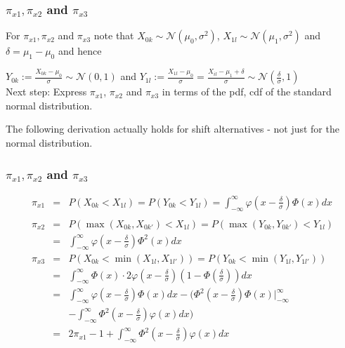 \documentclass[xcolor=pdftex,dvipsnames,table]{beamer}
\begin{document}
\begin{frame} %
\frametitle{$\pi_{x1}, \pi_{x2}$ and $\pi_{x3}$}
For $\pi_{x1}, \pi_{x2}$ and $\pi_{x3}$ note that
$X_{0k} \sim \mathcal{N}(\mu_0, \sigma^2)$, $X_{1l} \sim \mathcal{N}(\mu_1, \sigma^2)$ and $\delta = \mu_1 - \mu_0$ and hence

$Y_{0k}:=\frac{X_{0k} - \mu_0}{\sigma} \sim \mathcal{N}(0, 1)$ and $Y_{1l}:=\frac{X_{1l} - \mu_0}{\sigma} = \frac{X_{il} - \mu_1 + \delta}{\sigma} \sim \mathcal{N}( \frac{\delta}{\sigma}, 1)$
\\
Next step: Express $\pi_{x1}$, $\pi_{x2}$ and $\pi_{x3}$ in terms of the pdf, cdf of the standard normal distribution.

The following derivation actually holds for shift alternatives - not just for the normal distribution.
\end{frame}

\begin{frame} %
\frametitle{$\pi_{x1}, \pi_{x2}$ and $\pi_{x3}$}
\begin{eqnarray*}
\pi_{x1} & = & P(X_{0k} < X_{1l}) = P(Y_{0k} < Y_{1l}) = \int_{-\infty}^{\infty}\varphi(x - \frac{\delta}{\sigma}) \Phi(x) dx \\
\\
\pi_{x2} & = & P(\max(X_{0k}, X_{0k'}) < X_{1l}) = P(\max(Y_{0k}, Y_{0k'}) < Y_{1l}) \\
& = & \int_{-\infty}^{\infty}\varphi(x - \frac{\delta}{\sigma})\Phi^2(x) dx\\
\pi_{x3} & = & P(X_{0k} < \min(X_{1l}, X_{1l'})) = P(Y_{0k} < \min(Y_{1l}, Y_{1l'})) \\
& = & \int_{-\infty}^{\infty}\Phi(x) \cdot 2 \varphi(x - \frac{\delta}{\sigma}) (1 - \Phi(\frac{\delta}{\sigma}))dx\\
& = & \int_{-\infty}^{\infty}\varphi(x - \frac{\delta}{\sigma}) \Phi(x) dx - \Big( \Phi^2(x - \frac{\delta}{\sigma})\Phi(x)|_{-\infty}^{\infty}\\
&   & - \int_{-\infty}^{\infty} \Phi^2(x - \frac{\delta}{\sigma}) \varphi(x) dx\Big)\\
& = & 2\pi_{x1} - 1 + \int_{-\infty}^{\infty} \Phi^2(x - \frac{\delta}{\sigma}) \varphi(x) dx \\
\\
\end{eqnarray*}

\end{frame}
\end{document}

